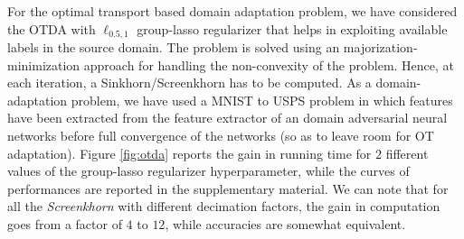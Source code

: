 For the optimal transport based domain adaptation problem, we have considered the
OTDA with $\ell_{0.5,1}$ group-lasso regularizer that helps in exploiting available labels in the source domain. The problem is solved using an majorization-minimization approach 
for handling the non-convexity of the problem. Hence, at each iteration, a Sinkhorn/Screenkhorn has to be computed. As a domain-adaptation problem, we have
used a MNIST to USPS problem in which features have been extracted from the
feature extractor of an domain adversarial neural networks \cite{ganin2016domain} before full convergence of the networks (so as to leave room for OT adaptation). 
Figure \ref{fig:otda} reports the gain in running time for $2$ fifferent values
of the group-lasso regularizer hyperparameter, while the curves of performances are
reported in the supplementary material. We can note that for all the  \emph{Screenkhorn} with different decimation factors, the gain in computation goes from a factor of $4$ to $12$, while accuracies are somewhat equivalent.



